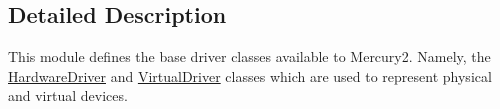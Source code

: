 \subsection{Detailed Description}
This module defines the base driver classes available to Mercury2. Namely, the \hyperlink{classhwm_1_1hardware_1_1devices_1_1drivers_1_1driver_1_1_hardware_driver}{Hardware\-Driver} and \hyperlink{classhwm_1_1hardware_1_1devices_1_1drivers_1_1driver_1_1_virtual_driver}{Virtual\-Driver} classes which are used to represent physical and virtual devices. 